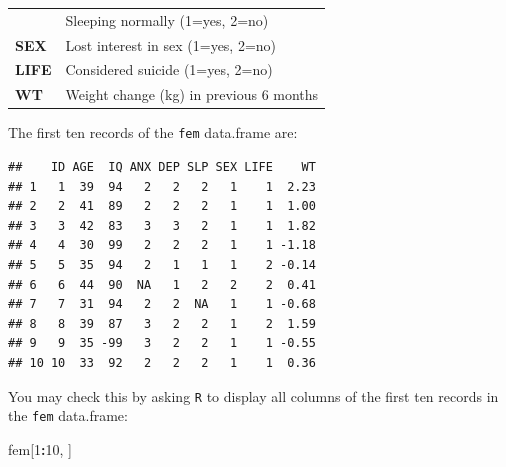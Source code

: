 \documentclass[12pt,]{book}
\newenvironment{Shaded}{\begin{snugshade}}{\end{snugshade}}
\newcommand{\DecValTok}[1]{\textcolor[rgb]{0.00,0.00,0.81}{#1}}
\newcommand{\OperatorTok}[1]{\textcolor[rgb]{0.81,0.36,0.00}{\textbf{#1}}}
\newcommand{\NormalTok}[1]{#1}
\theoremstyle{definition}
\theoremstyle{definition}
\theoremstyle{definition}
\theoremstyle{remark}
\begin{document}
\begin{longtable}[]{@{}ll@{}}
\begin{minipage}[t]{0.14\columnwidth}
\end{minipage} & \begin{minipage}[t]{0.69\columnwidth}\raggedright
Sleeping normally (1=yes, 2=no)\strut
\end{minipage}\tabularnewline
\begin{minipage}[t]{0.14\columnwidth}\raggedright
\textbf{SEX}\strut
\end{minipage} & \begin{minipage}[t]{0.69\columnwidth}\raggedright
Lost interest in sex (1=yes, 2=no)\strut
\end{minipage}\tabularnewline
\begin{minipage}[t]{0.14\columnwidth}\raggedright
\textbf{LIFE}\strut
\end{minipage} & \begin{minipage}[t]{0.69\columnwidth}\raggedright
Considered suicide (1=yes, 2=no)\strut
\end{minipage}\tabularnewline
\begin{minipage}[t]{0.14\columnwidth}\raggedright
\textbf{WT}\strut
\end{minipage} & \begin{minipage}[t]{0.69\columnwidth}\raggedright
Weight change (kg) in previous 6 months\strut
\end{minipage}\tabularnewline
\bottomrule
\end{longtable}

The first ten records of the \texttt{fem} data.frame are:

\begin{verbatim}
##    ID AGE  IQ ANX DEP SLP SEX LIFE    WT
## 1   1  39  94   2   2   2   1    1  2.23
## 2   2  41  89   2   2   2   1    1  1.00
## 3   3  42  83   3   3   2   1    1  1.82
## 4   4  30  99   2   2   2   1    1 -1.18
## 5   5  35  94   2   1   1   1    2 -0.14
## 6   6  44  90  NA   1   2   2    2  0.41
## 7   7  31  94   2   2  NA   1    1 -0.68
## 8   8  39  87   3   2   2   1    2  1.59
## 9   9  35 -99   3   2   2   1    1 -0.55
## 10 10  33  92   2   2   2   1    1  0.36
\end{verbatim}

You may check this by asking \texttt{R} to display all columns of the
first ten records in the \texttt{fem} data.frame:

\begin{Shaded}
\begin{Highlighting}[]
\NormalTok{fem[}\DecValTok{1}\OperatorTok{:}\DecValTok{10}\NormalTok{, ]}
\end{Highlighting}
\end{Shaded}
\end{document}
